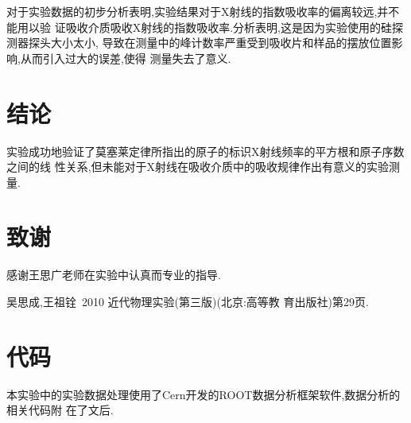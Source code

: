 \documentclass[aps,pre,12pt,preprint,onecolumn,showpacs,showkeys]{revtex4-1}
\begin{document}
对于实验数据的初步分析表明,实验结果对于X射线的指数吸收率的偏离较远,并不能用以验
证吸收介质吸收X射线的指数吸收率.分析表明,这是因为实验使用的硅探测器探头大小太小,
导致在测量中的峰计数率严重受到吸收片和样品的摆放位置影响,从而引入过大的误差,使得
测量失去了意义.

\section{结论}

实验成功地验证了莫塞莱定律所指出的原子的标识X射线频率的平方根和原子序数之间的线
性关系,但未能对于X射线在吸收介质中的吸收规律作出有意义的实验测量.
 
\section{致谢}

感谢王思广老师在实验中认真而专业的指导.
 
\begin{thebibliography}{}
 吴思成,王祖铨~2010 近代物理实验(第三版)(北京:高等教
育出版社)第29页.
\end{thebibliography}
 
\clearpage
\appendix
 
\section{代码}

本实验中的实验数据处理使用了Cern开发的ROOT数据分析框架软件,数据分析的相关代码附
在了文后.


 
\end{document}
